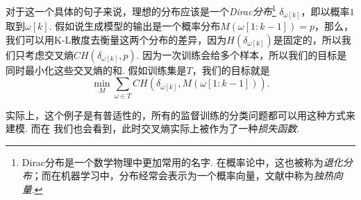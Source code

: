 对于这一个具体的句子来说，理想的分布应该是一个\emph{Dirac分布}\footnote{Dirac分布是一个数学物理中更加常用的名字. 在概率论中，这也被称为\emph{退化分布}；而在机器学习中，分布经常会表示为一个概率向量，文献中称为\emph{独热向量}. } $\delta_{\omega[k]}$，即以概率$1$取到$\omega[k]$. 假如说生成模型的输出是一个概率分布$M(\omega[1:k-1])=p$，那么，我们可以用K-L散度去衡量这两个分布的差异，因为$H(\delta_{\omega[k]})$是固定的，所以我们只考虑交叉熵$CH(\delta_{\omega[k]},p)$. 因为一次训练会给多个样本，所以我们的目标是同时最小化这些交叉熵的和. 假如训练集是$T$，我们的目标就是
\[
    \min_{M} \sum_{\omega\in T} CH(\delta_{\omega[k]},M(\omega[1:k-1])).
\]

实际上，这个例子是有普适性的，所有的监督训练的分类问题都可以用这种方式来建模. 而在  我们也会看到，此时交叉熵实际上被作为了一种\emph{损失函数}.

